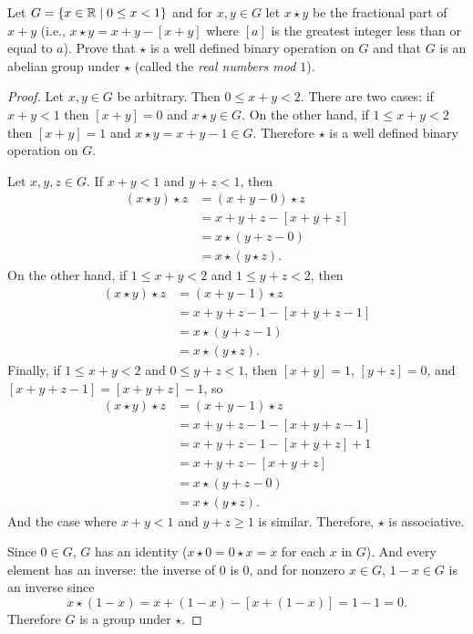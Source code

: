  Let $G = \{x\in\mathbb{R}\mid 0\leq x<1\}$ and for $x,y\in G$ let
$x\star y$ be the fractional part of $x + y$ (i.e.,
$x\star y = x + y - [x + y]$ where $[a]$ is the greatest integer less
than or equal to $a$). Prove that $\star$ is a well defined binary
operation on $G$ and that $G$ is an abelian group under $\star$
(called the {\em real numbers mod $1$}).
\begin{proof}
  Let $x,y\in G$ be arbitrary. Then $0\leq x + y<2$. There are two
  cases: if $x + y < 1$ then $[x + y] = 0$ and $x\star y\in G$. On the
  other hand, if $1\leq x + y < 2$ then $[x + y] = 1$ and
  $x\star y = x + y - 1\in G$. Therefore $\star$ is a well defined
  binary operation on $G$.

  Let $x,y,z\in G$. If $x + y < 1$ and $y + z < 1$, then
  \begin{align*}
    (x\star y)\star z
    &= (x + y - 0)\star z \\
    &= x + y + z - [x + y + z] \\
    &= x\star(y + z - 0) \\
    &= x\star(y\star z).
  \end{align*}
  On the other hand, if $1\leq x + y < 2$ and $1\leq y + z < 2$, then
  \begin{align*}
    (x\star y)\star z
    &= (x + y - 1)\star z \\
    &= x + y + z - 1 - [x + y + z - 1] \\
    &= x\star(y + z - 1) \\
    &= x\star(y\star z).
  \end{align*}
  Finally, if $1\leq x + y < 2$ and $0\leq y + z < 1$, then
  $[x + y] = 1$, $[y + z] = 0$, and
  $[x + y + z - 1] = [x + y + z] - 1$, so
  \begin{align*}
    (x\star y)\star z
    &= (x + y - 1)\star z \\
    &= x + y + z - 1 - [x + y + z - 1] \\
    &= x + y + z - 1 - [x + y + z] + 1 \\
    &= x + y + z - [x + y + z] \\
    &= x\star(y + z - 0) \\
    &= x\star(y\star z).
  \end{align*}
  And the case where $x+y < 1$ and $y + z\geq1$ is similar. Therefore,
  $\star$ is associative.

  Since $0\in G$, $G$ has an identity ($x\star 0 = 0\star x = x$ for
  each $x$ in $G$). And every element has an inverse: the inverse of
  $0$ is $0$, and for nonzero $x\in G$, $1 - x\in G$ is an inverse
  since
  \begin{equation*}
    x\star(1-x) = x + (1 - x) - [x + (1 - x)]
    = 1 - 1 = 0.
  \end{equation*}
  Therefore $G$ is a group under $\star$.
\end{proof}


